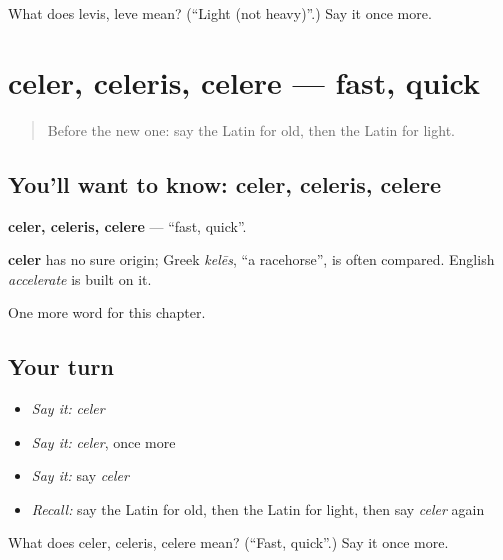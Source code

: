 \begin{tcolorbox}[breakable,colback=teal!4,colframe=teal!35!black,title={Before you move on}]
What does levis, leve mean? (\textquotedblleft{}Light (not heavy)\textquotedblright{}.) Say it once more.
\end{tcolorbox}
\section[celer, celeris, celere]{celer, celeris, celere — fast, quick}

\label{lesson:LA-C94-celer}



\begin{quote}
Before the new one: say the Latin for old, then the Latin for light.
\end{quote}

\subsection*{You'll want to know: celer, celeris, celere}
\textbf{celer, celeris, celere} — \textquotedblleft{}fast, quick\textquotedblright{}.

\begin{cousinweb}
\textbf{celer} has no sure origin; Greek \emph{kelēs}, \textquotedblleft{}a racehorse\textquotedblright{}, is often compared. English \emph{accelerate} is built on it.
\end{cousinweb}

\begin{grammarlens}[title={What you've built}]
One more word for this chapter.
\end{grammarlens}

\subsection*{Your turn}
\begin{itemize}
\raggedright
  \item \emph{Say it:} \emph{celer}
  \item \emph{Say it:} \emph{celer}, once more
  \item \emph{Say it:} say \emph{celer}
  \item \emph{Recall:} say the Latin for old, then the Latin for light, then say \emph{celer} again
\end{itemize}

\begin{tcolorbox}[breakable,colback=teal!4,colframe=teal!35!black,title={Before you move on}]
What does celer, celeris, celere mean? (\textquotedblleft{}Fast, quick\textquotedblright{}.) Say it once more.
\end{tcolorbox}
